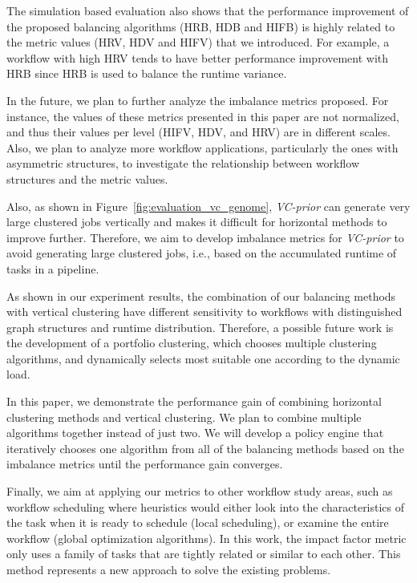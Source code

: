The simulation based evaluation also shows that the performance improvement of the proposed balancing algorithms (HRB, HDB and HIFB) is highly related to the metric values (HRV, HDV and HIFV) that we introduced. For example, a workflow with high HRV tends to have better performance improvement with HRB since HRB is used to balance the runtime variance. 

In the future, we plan to further analyze the imbalance metrics proposed. For instance, the values of these metrics presented in this paper are not normalized, and thus their values per level (HIFV, HDV, and HRV) are in different scales. Also, we plan to analyze more workflow applications, particularly the ones with asymmetric structures, to investigate the relationship between workflow structures and the metric values. 

Also, as shown in Figure~\ref{fig:evaluation_vc_genome}, \emph{VC-prior} can generate very large clustered jobs vertically and makes it difficult for horizontal methods to improve further. Therefore, we aim to develop imbalance metrics for \emph{VC-prior} to avoid generating large clustered jobs, i.e., based on the accumulated runtime of tasks in a pipeline. 


As shown in our experiment results, the combination of our balancing methods with vertical clustering have different sensitivity to workflows with distinguished graph structures and runtime distribution. Therefore, a possible future work is the development of a portfolio clustering, which chooses multiple clustering algorithms, and dynamically selects most suitable one according to the dynamic load.

In this paper, we demonstrate the performance gain of combining horizontal clustering methods and vertical clustering. We plan to combine multiple algorithms together instead of just two. We will develop a policy engine that iteratively chooses one algorithm from all of the balancing methods based on the imbalance metrics until the performance gain converges. 

Finally, we aim at applying our metrics to other workflow study areas, such as workflow scheduling where heuristics would either look into the characteristics of the task when it is ready to schedule (local scheduling), or examine the entire workflow (global optimization algorithms). In this work, the impact factor metric only uses a family of tasks that are tightly related or similar to each other. This method represents a new approach to solve the existing problems. 



